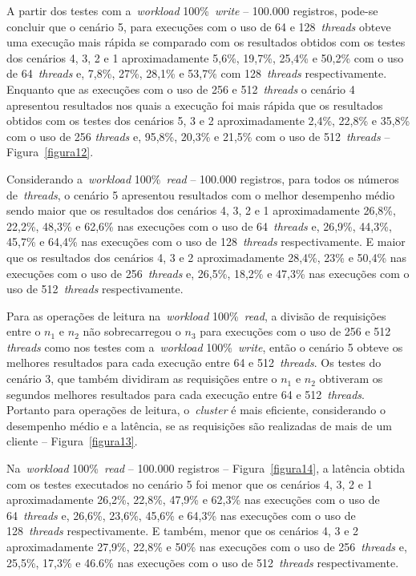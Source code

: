 \documentclass[12pt]{article}
\begin{document}
A partir dos testes com a~\emph{workload} 100\%~\emph{write} -- 100.000 registros, pode-se concluir que o cenário 5, para execuções com o uso de 64 e 128~\emph{threads} obteve uma execução mais rápida se comparado com os resultados obtidos com os testes dos cenários 4, 3, 2 e 1 aproximadamente 5,6\%, 19,7\%, 25,4\% e 50,2\% com o uso de 64~\emph{threads} e, 7,8\%, 27\%, 28,1\% e 53,7\% com 128~\emph{threads} respectivamente. Enquanto que as execuções com o uso de 256 e 512~\emph{threads} o cenário 4 apresentou resultados nos quais a execução foi mais rápida que os resultados obtidos com os testes dos cenários 5, 3 e 2 aproximadamente 2,4\%, 22,8\% e 35,8\% com o uso de 256 \emph{threads} e, 95,8\%, 20,3\% e 21,5\% com o uso de 512~\emph{threads} -- Figura~\ref{figura12}.

Considerando a~\emph{workload} 100\%~\emph{read} -- 100.000 registros, para todos os números de~\emph{threads}, o cenário 5 apresentou resultados com o melhor desempenho médio sendo maior que os resultados dos cenários 4, 3, 2 e 1 aproximadamente 26,8\%, 22,2\%, 48,3\% e 62,6\% nas execuções com o uso de 64~\emph{threads} e, 26,9\%, 44,3\%, 45,7\% e 64,4\% nas execuções com o uso de 128~\emph{threads} respectivamente. E maior que os resultados dos cenários 4, 3 e 2 aproximadamente 28,4\%, 23\% e 50,4\% nas execuções com o uso de 256~\emph{threads} e, 26,5\%, 18,2\% e 47,3\% nas execuções com o uso de 512~\emph{threads} respectivamente.

Para as operações de leitura na~\emph{workload} 100\%~\emph{read}, a divisão de requisições entre o $n_1$ e $n_2$ não sobrecarregou o $n_3$ para execuções com o uso de 256 e 512 \emph{threads} como nos testes com a~\emph{workload} 100\%~\emph{write}, então o cenário 5 obteve os melhores resultados para cada execução entre 64 e 512~\emph{threads}. Os testes do cenário 3, que também dividiram as requisições entre o $n_1$ e $n_2$ obtiveram os segundos melhores resultados para cada execução entre 64 e 512~\emph{threads}. Portanto para operações de leitura, o~\emph{cluster} é mais eficiente, considerando o desempenho médio e a latência, se as requisições são realizadas de mais de um cliente -- Figura~\ref{figura13}.

Na~\emph{workload} 100\%~\emph{read} -- 100.000 registros -- Figura~\ref{figura14}, a latência obtida com os testes executados no cenário 5 foi menor que os cenários 4, 3, 2 e 1 aproximadamente 26,2\%, 22,8\%, 47,9\% e 62,3\% nas execuções com o uso de 64~\emph{threads} e, 26,6\%, 23,6\%, 45,6\% e 64,3\% nas execuções com o uso de 128~\emph{threads} respectivamente. E também, menor que os cenários 4, 3 e 2 aproximadamente 27,9\%, 22,8\% e 50\% nas execuções com o uso de 256~\emph{threads} e, 25,5\%, 17,3\% e 46.6\% nas execuções com o uso de 512~\emph{threads} respectivamente.
\end{document}

